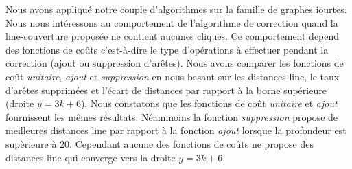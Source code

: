 Nous avons appliqu\'e notre couple d'algorithmes sur la famille de graphes iourtes. Nous nous  int\'eressons au comportement de l'algorithme de correction quand la line-couverture propos\'ee ne contient aucunes cliques. Ce comportement depend des fonctions de co\^uts c'est-\`a-dire le type d'op\'erations \`a effectuer pendant la correction (ajout ou suppression d'ar\^etes).
\newline
Nous avons comparer les fonctions de co\^ut {\em unitaire}, {\em ajout} et {\em suppression} en nous basant sur les distances line, le taux d'ar\^etes supprim\'ees et l'\'ecart de distances par rapport \`a la borne sup\'erieure (droite $y = 3k +6$).
Nous constatons que les fonctions de co\^ut {\em unitaire} et {\em ajout} fournissent les m\^emes r\'esultats. N\'eammoins la fonction {\em suppression}  propose de meilleures distances line par rapport \`a la fonction {\em ajout} lorsque la profondeur est sup\`erieure \`a $20$.
Cependant aucune des fonctions de co\^uts ne propose des distances line qui converge vers la droite $y = 3k +6$.